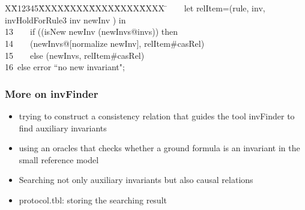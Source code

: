 \documentclass{beamer}
\newlength{\fminilength}
\newenvironment{fmini}[1][\linewidth]
  {\setlength{\fminilength}{#1\fboxsep-2\fboxrule}%
   \vspace{2ex}\noindent\begin{lrbox}{\fminibox}\begin{minipage}{\fminilength}%
   \mbox{ }\hfill\vspace{-2.5ex}}%
  {\end{minipage}\end{lrbox}\vspace{1ex}\hspace{0ex}%
   \framebox{\usebox{\fminibox}}}
\newenvironment{specification}
{\noindent\scriptsize
\tt\begin{fmini}\begin{tabbing}X\=X12345\=XXXX\=XXXX\=XXXX\=XXXX\=XXXX
\=\+\kill} {\end{tabbing}\normalfont\end{fmini}}
\def \twoSpaces {\ \ }
\def \oneSpace {\ }
\def \oneSpace {\ }
\begin{document}
\begin{frame}
\begin{specification}
12\twoSpaces  \twoSpaces     let relItem=(rule, inv,  invHoldForRule3 inv newInv   ) in\\

13\twoSpaces  \twoSpaces   if   ((isNew newInv (newInvs@invs)) then\\
14\twoSpaces  \twoSpaces   (newInvs@[normalize newInv], relItem\#casRel)\\
15\twoSpaces  \twoSpaces   else (newInvs,  relItem\#casRel)\\


16\oneSpace  else  error ``no new invariant";\\
\end{specification}
 \end{frame}


\begin{frame}\frametitle{More on {\sf invFinder}}


\begin{itemize}
\item trying to construct a consistency relation that
guides the tool {\sf invFinder} to find auxiliary invariants

\item using an oracles that checks whether a ground
formula is an invariant in the small reference model 


\item Searching not only auxiliary invariants but also causal relations

\item   protocol.tbl:  storing the searching result
\end{itemize}
 \end{frame}
\end{document}
